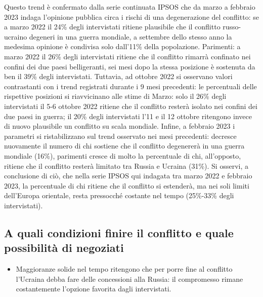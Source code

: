 \documentclass[
]{book}
\providecommand{\tightlist}{%
  \setlength{\itemsep}{0pt}\setlength{\parskip}{0pt}}
\begin{document}
Questo trend è confermato dalla serie continuata IPSOS che da marzo a febbraio 2023 indaga l'opinione pubblica circa i rischi di una degenerazione del conflitto: se a marzo 2022 il 24\% degli intervistati ritiene plausibile che il conflitto russo-ucraino degeneri in una guerra mondiale, a settembre dello stesso anno la medesima opinione è condivisa solo dall'11\% della popolazione. Parimenti: a marzo 2022 il 26\% degli intervistati ritiene che il conflitto rimarrà confinato nei confini dei due paesi belligeranti, sei mesi dopo la stessa posizione è sostenuta da ben il 39\% degli intervistati. Tuttavia, ad ottobre 2022 si osservano valori contrastanti con i trend registrati durante i 9 mesi precedenti: le percentuali delle rispettive posizioni si riavvicinano alle stime di Marzo: solo il 26\% degli intervistati il 5-6 ottobre 2022 ritiene che il conflitto resterà isolato nei confini dei due paesi in guerra; il 20\% degli intervistati l'11 e il 12 ottobre ritengono invece di nuovo plausibile un conflitto su scala mondiale. Infine, a febbraio 2023 i parametri si ristabilizzano sul trend osservato nei mesi precedenti: decresce nuovamente il numero di chi sostiene che il conflitto degenererà in una guerra mondiale (16\%), parimenti cresce di molto la percentuale di chi, all'opposto, ritiene che il conflitto resterà limitato tra Russia e Ucraina (31\%). Si osservi, a conclusione di ciò, che nella serie IPSOS qui indagata tra marzo 2022 e febbraio 2023, la percentuale di chi ritiene che il conflitto si estenderà, ma nei soli limiti dell'Europa orientale, resta pressocché costante nel tempo (25\%-33\% degli intervistati).

\hypertarget{a-quali-condizioni-finire-il-conflitto-e-quale-possibilituxe0-di-negoziati}{%
\subsection{A quali condizioni finire il conflitto e quale possibilità di negoziati}\label{a-quali-condizioni-finire-il-conflitto-e-quale-possibilituxe0-di-negoziati}}

\begin{itemize}
\tightlist
\item
  Maggioranze solide nel tempo ritengono che per porre fine al conflitto l'Ucraina debba fare delle concessioni alla Russia: il compromesso rimane costantemente l'opzione favorita dagli intervistati.
\end{itemize}
\end{document}
